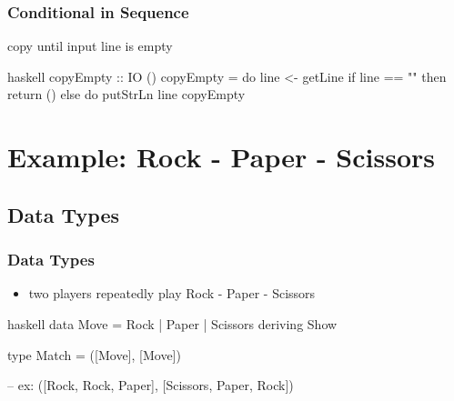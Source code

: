 \documentclass[dvipsnames]{beamer}
\theoremstyle{plain}
\begin{document}
\begin{frame}[fragile]
  \frametitle{Conditional in Sequence}

  \begin{exampleblock}{copy until input line is empty}
    \begin{pygments}{haskell}
copyEmpty :: IO ()
copyEmpty = do
    line <- getLine
    if line == ""
        then return ()
        else do
            putStrLn line
            copyEmpty
    \end{pygments}
  \end{exampleblock}
\end{frame}

\section{Example: Rock - Paper - Scissors}

\subsection{Data Types}

\begin{frame}[fragile]
  \frametitle{Data Types}

  \begin{itemize}
    \item two players repeatedly play Rock - Paper - Scissors
  \end{itemize}

  \begin{exampleblock}{}
    \begin{pygments}{haskell}
data Move = Rock | Paper | Scissors
            deriving Show

type Match = ([Move], [Move])

-- ex: ([Rock, Rock, Paper], [Scissors, Paper, Rock])
    \end{pygments}
  \end{exampleblock}
\end{frame}
\end{document}

